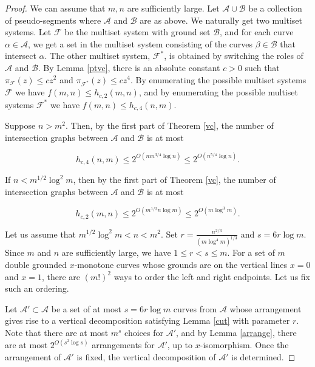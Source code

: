 \documentclass[11pt]{article}
\theoremstyle{plain}
\theoremstyle{definition}
\theoremstyle{remark}
\begin{document}
\begin{proof}
We can assume that $m,n$ are sufficiently large.  Let $\mathcal{A}\cup\mathcal{B}$ be a collection of pseudo-segments where $\mathcal{A}$ and $\mathcal{B}$ are as above. We naturally get two multiset systems.  Let $\mathcal{F}$ be the multiset system with ground set $\mathcal{B}$, and for each curve $\alpha \in \mathcal{A}$, we get a set in the multiset system consisting of the curves $\beta \in \mathcal{B}$ that intersect $\alpha$. The other multiset system, $\mathcal{F}^{\ast}$, is obtained by switching the roles of $\mathcal{A}$ and $\mathcal{B}$. By Lemma \ref{ptvc}, there is an absolute constant $c> 0$ such that $\pi_{\mathcal{F}}(z) \leq cz^2$ and $\pi_{\mathcal{F}^{\ast}}(z) \leq cz^4$.  By enumerating the possible multiset systems $\mathcal{F}$ we have $f(m,n) \leq h_{c,2}(m,n)$, and by enumerating the possible multiset systems $\mathcal{F}^{\ast}$ we have $f(m,n) \leq h_{c,4}(n,m)$.

Suppose $n > m^2$.  Then, by the first part of Theorem \ref{vc}, the number of intersection graphs between $\mathcal{A}$ and $\mathcal{B}$ is at most

\begin{equation}\label{eqnl1}
    h_{c,4}(n,m) \leq 2^{O(mn^{3/4}\log n)}\leq 2^{O(n^{5/4}\log n)}.
\end{equation} 

\noindent  If $n < m^{1/2}\log^2 m$, then by the first part of Theorem \ref{vc}, the number of intersection graphs between $\mathcal{A}$ and $\mathcal{B}$ is at most


\begin{equation}\label{eqnl2}
    h_{c,2}(m,n) \leq 2^{O(m^{1/2}n\log m)}\leq 2^{O(m\log^3 m)}.
\end{equation}
 
Let us assume that $m^{1/2}\log^2m < n < m^2$.   Set $r = \frac{n^{2/3}}{(m\log^{4} m)^{1/3}}$ and $s = 6r\log m$.  Since $m$ and $n$ are sufficiently large, we have $1 \leq r < s \leq m$.  For a set of $m$ double grounded $x$-monotone curves whose grounds are on the vertical lines $x  = 0$ and $x = 1$, there are $(m!)^2$ ways to order the left and right endpoints.  Let us fix such an ordering. 

Let $\mathcal{A}'\subset \mathcal{A}$ be a set of at most $s = 6r\log m$ curves from $\mathcal{A}$ whose arrangement gives rise to a vertical decomposition satisfying Lemma \ref{cut} with parameter $r$.  Note that there are at most $m^s$ choices for $\mathcal{A}'$, and by Lemma \ref{arrange}, there are at most $2^{O(s^2\log s)}$ arrangements for $\mathcal{A}'$, up to $x$-isomorphism.   Once the arrangement of $\mathcal{A}'$ is fixed, the vertical decomposition of $\mathcal{A}'$ is determined.  



\end{proof}
\end{document}
